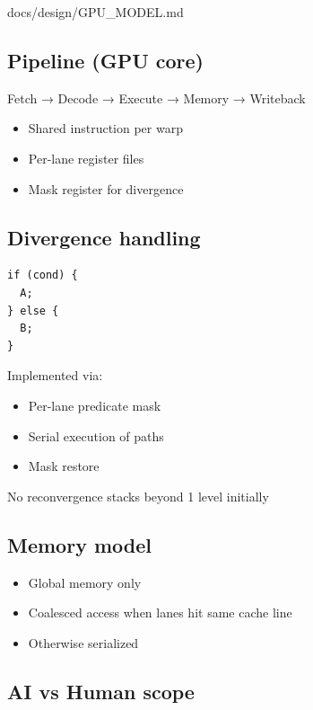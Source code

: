 \begin{relocated}{docs/design/GPU_MODEL.md}
\subsection{Pipeline (GPU core)}\label{ds:ch:gpu-model:pipeline-gpu-core}

\begin{textblock}
Fetch → Decode → Execute → Memory → Writeback
\end{textblock}

\begin{itemize}
\tightlist
\item
  Shared instruction per warp
\item
  Per-lane register files
\item
  Mask register for divergence
\end{itemize}

\subsection{Divergence handling}\label{ds:ch:gpu-model:divergence-handling}

\begin{lstlisting}[language={}]
if (cond) {
  A;
} else {
  B;
}
\end{lstlisting}

Implemented via:

\begin{itemize}
\tightlist
\item
  Per-lane predicate mask
\item
  Serial execution of paths
\item
  Mask restore
\end{itemize}

\hold{} No reconvergence stacks beyond 1 level initially

\subsection{Memory model}\label{ds:ch:gpu-model:memory-model}

\begin{itemize}
\tightlist
\item
  Global memory only
\item
  Coalesced access when lanes hit same cache line
\item
  Otherwise serialized
\end{itemize}

\subsection{AI vs Human scope}\label{ds:ch:gpu-model:ai-vs-human-scope}


\end{relocated}
